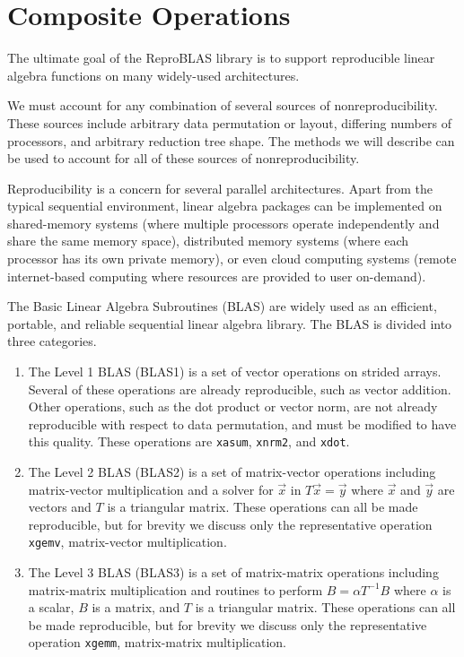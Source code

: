 \section{Composite Operations}
  \label{sec:compositeops}
  The ultimate goal of the ReproBLAS library is to support reproducible linear algebra functions on many widely-used architectures.

  We must account for any combination of several sources of
  nonreproducibility. These sources include arbitrary data
  permutation or layout, differing numbers of processors, and arbitrary
  reduction tree shape. The methods we will describe can be used to
  account for all of these sources of nonreproducibility.

  Reproducibility is a concern for several parallel architectures. Apart from the typical sequential environment, linear algebra packages can be implemented on shared-memory systems (where multiple processors operate independently and share the same memory space), distributed memory systems (where each processor has its own private memory), or even cloud computing systems (remote internet-based computing where resources are provided to user on-demand).

  The Basic Linear Algebra Subroutines (BLAS) \cite{BLAS} are widely
  used as an efficient, portable, and reliable sequential linear algebra library.
  The BLAS is divided into three categories.
  \begin{enumerate}
    \item The Level 1 BLAS (BLAS1) is a set of vector operations on
      strided arrays. Several of these operations are already
      reproducible, such as vector addition. Other operations, such as
      the dot product or vector norm, are not already reproducible with
      respect to data permutation, and must be modified to have this quality. These operations
      are \texttt{xasum}, \texttt{xnrm2}, and 
      \texttt{xdot}.
    \item The Level 2 BLAS (BLAS2) is a set of matrix-vector operations
      including matrix-vector multiplication and a solver for $\vec{x}$ in $T\vec{x} = \vec{y}$ where $\vec{x}$ and $\vec{y}$ are vectors and $T$ is a triangular matrix. These operations can all be made reproducible, but for brevity we discuss only the representative operation \texttt{xgemv}, matrix-vector multiplication.
    \item The Level 3 BLAS (BLAS3) is a set of matrix-matrix operations
      including matrix-matrix multiplication and routines to perform $B = \alpha T^{-1}B$ where $\alpha$ is a scalar, $B$ is a matrix, and $T$ is a triangular matrix. These operations can all be made reproducible, but for brevity we discuss only the representative operation \texttt{xgemm}, matrix-matrix multiplication.
  \end{enumerate}


